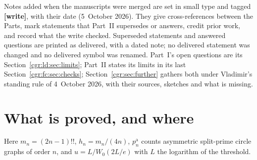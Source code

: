 \documentclass[11pt,letterpaper]{article}
\numberwithin{equation}{section}
\theoremstyle{definition}\newtheorem{definition}[theorem]{Definition}
\theoremstyle{remark}\newtheorem{remark}[theorem]{Remark}
\begin{document}
Notes added when the manuscripts were merged are set in small type and tagged \textbf{[write]}, with their date (5~October 2026). They give cross-references between the Parts, mark statements that Part~II supersedes or answers, credit prior work, and record what the write checked. Superseded statements and answered questions are printed as delivered, with a dated note; no delivered statement was changed and no delivered symbol was renamed. Part~I's open questions are its Section~\ref{cgr:ld:sec:limits}; Part~II states its limits in its last Section~\ref{cgr:fc:sec:checks}; Section~\ref{cgr:sec:further} gathers both under Vladimir's standing rule of 4~October 2026, with their sources, sketches and what is missing.

\section*{What is proved, and where}\label{cgr:sec:status}
Here $m_n=(2n-1)!!$, $h_n=m_n/(4n)$, $p_n^{\mathrm a}$ counts asymmetric split-prime circle graphs of order $n$, and $u=L/W_0(2L/e)$ with $L$ the logarithm of the threshold.
\end{document}
